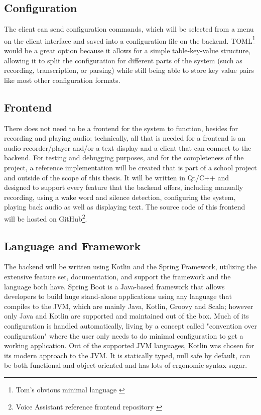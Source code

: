 \subsection{Configuration}
The client can send configuration commands, which will be selected from a menu on the client interface and saved into a configuration file
on the backend. TOML\footnote{Tom's obvious minimal language \cite{toml}} would be a great option because it allows for a simple table-key-value structure, allowing it to split
the configuration for different parts of the system (such as recording, transcription, or parsing) while still being able
to store key value pairs like most other configuration formats.

\subsection{Frontend}
There does not need to be a frontend for the system to function, besides for recording and playing audio; technically, all that is needed for a frontend
is an audio recorder/player and/or a text display and a client that can connect to the backend. For testing and debugging purposes, and for
the completeness of the project, a reference implementation will be created that is part of a school project and outside of the scope of this thesis.
It will be written in Qt/C++ and designed to support every feature that the backend offers, including manually recording, using a wake word and silence detection,
configuring the system, playing back audio as well as displaying text. The source code of this frontend will be hosted on GitHub\footnote{Voice Assistant reference frontend repository \cite{frontend}}.

\subsection{Language and Framework} \label{subsec:language-and-framework}
The backend will be written using Kotlin and the Spring Framework, utilizing the extensive feature set, documentation, and support the framework and the language both have.
Spring Boot is a Java-based framework that allows developers to build huge stand-alone applications using any language that compiles to the JVM,
which are mainly Java, Kotlin, Groovy and Scala; however only Java and Kotlin are supported and maintained out of the box.
Much of its configuration is handled automatically, living by a concept called "convention over configuration"
where the user only needs to do minimal configuration to get a working application.
Out of the supported JVM languages, Kotlin was chosen for its modern approach to the JVM. It is statically typed, null safe by default,
can be both functional and object-oriented and has lots of ergonomic syntax sugar.

